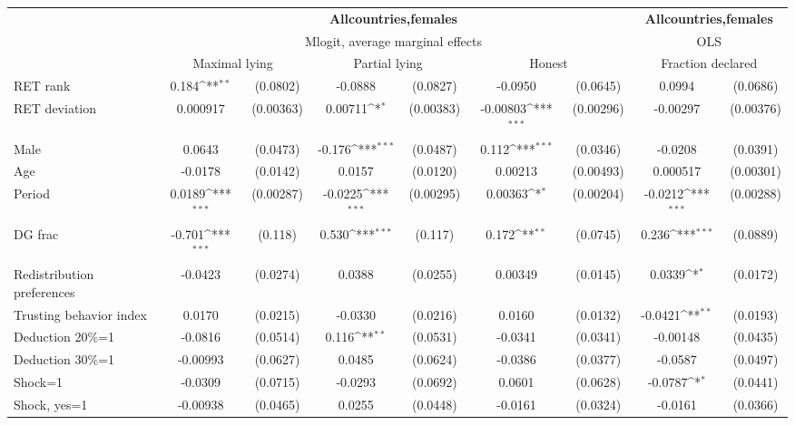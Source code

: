 \def\sym#1{\ifmmode^{#1}\else\(^{#1}\)\fi}
\begin{tabular}{l|cccccc|cc}
\hline\hline
&\multicolumn{6}{c|}{\bf All\space{}countries,\space{}females}&\multicolumn{2}{c}{\bf All\space{}countries,\space{}females}\\ &\multicolumn{6}{c|}{Mlogit, average marginal effects }&\multicolumn{2}{c}{OLS}\\
                &\multicolumn{2}{c}{Maximal lying}&\multicolumn{2}{c}{Partial lying}&\multicolumn{2}{c}{Honest}  &\multicolumn{2}{c}{Fraction declared}\\
\hline
RET rank        &    0.184\sym{**} & (0.0802)&  -0.0888         & (0.0827)&  -0.0950         & (0.0645)&   0.0994         & (0.0686)\\
RET deviation   & 0.000917         &(0.00363)&  0.00711\sym{*}  &(0.00383)& -0.00803\sym{***}&(0.00296)& -0.00297         &(0.00376)\\
Male            &   0.0643         & (0.0473)&   -0.176\sym{***}& (0.0487)&    0.112\sym{***}& (0.0346)&  -0.0208         & (0.0391)\\
Age             &  -0.0178         & (0.0142)&   0.0157         & (0.0120)&  0.00213         &(0.00493)& 0.000517         &(0.00301)\\
Period          &   0.0189\sym{***}&(0.00287)&  -0.0225\sym{***}&(0.00295)&  0.00363\sym{*}  &(0.00204)&  -0.0212\sym{***}&(0.00288)\\
DG frac         &   -0.701\sym{***}&  (0.118)&    0.530\sym{***}&  (0.117)&    0.172\sym{**} & (0.0745)&    0.236\sym{***}& (0.0889)\\
Redistribution preferences&  -0.0423         & (0.0274)&   0.0388         & (0.0255)&  0.00349         & (0.0145)&   0.0339\sym{*}  & (0.0172)\\
Trusting behavior index&   0.0170         & (0.0215)&  -0.0330         & (0.0216)&   0.0160         & (0.0132)&  -0.0421\sym{**} & (0.0193)\\
Deduction 20\%=1&  -0.0816         & (0.0514)&    0.116\sym{**} & (0.0531)&  -0.0341         & (0.0341)& -0.00148         & (0.0435)\\
Deduction 30\%=1& -0.00993         & (0.0627)&   0.0485         & (0.0624)&  -0.0386         & (0.0377)&  -0.0587         & (0.0497)\\
Shock=1         &  -0.0309         & (0.0715)&  -0.0293         & (0.0692)&   0.0601         & (0.0628)&  -0.0787\sym{*}  & (0.0441)\\
Shock, yes=1    & -0.00938         & (0.0465)&   0.0255         & (0.0448)&  -0.0161         & (0.0324)&  -0.0161         & (0.0366)\\

\end{tabular}
